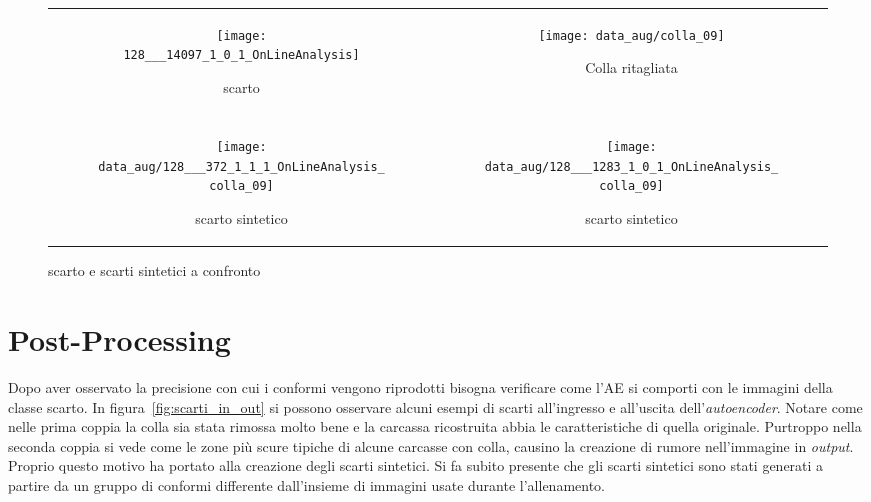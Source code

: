 \begin{figure}[ht] %
  \begin{center}
    \begin{tabular}{cc}
      \begin{subfigure}{.4\linewidth}
        \centering\texttt{[image: 128\_\_\_14097\_1\_0\_1\_OnLineAnalysis]}
        \caption{scarto}
      \end{subfigure} &

      \begin{subfigure}{.4\linewidth}
        \centering\texttt{[image: data\_aug/colla\_09]}
        \caption{Colla ritagliata}
        \label{fig:ritaglio_colla}
      \end{subfigure} \\ \\

      \begin{subfigure}{.4\linewidth}
        \centering\texttt{[image: data\_aug/128\_\_\_372\_1\_1\_1\_OnLineAnalysis\_colla\_09]}
        \caption{scarto sintetico}
        \label{fig:scarto_sintetico_c}
      \end{subfigure} &

      \begin{subfigure}{.4\linewidth}
        \centering\texttt{[image: data\_aug/128\_\_\_1283\_1\_0\_1\_OnLineAnalysis\_colla\_09]}
        \caption{scarto sintetico}
        \label{fig:scarto_sintetico_d}
      \end{subfigure}
    \end{tabular}
    \caption{scarto e scarti sintetici a confronto}
    \label{fig:esempi_scarti_sintetici}
  \end{center}
\end{figure}

\section{Post-Processing}
Dopo aver osservato la precisione con cui i conformi vengono riprodotti bisogna verificare come l'AE si comporti con le immagini della classe scarto.
In figura~\ref{fig:scarti_in_out} si possono osservare alcuni esempi di scarti all'ingresso e all'uscita dell'\textit{autoencoder}.
Notare come nelle prima coppia la colla sia stata rimossa molto bene e la carcassa ricostruita abbia le caratteristiche di quella originale.
Purtroppo nella seconda coppia si vede come le zone più scure tipiche di alcune carcasse con colla, causino la creazione di rumore nell'immagine in \textit{output}.
Proprio questo motivo ha portato alla creazione degli scarti sintetici.
Si fa subito presente che gli scarti sintetici sono stati generati a partire da un gruppo di conformi differente dall'insieme di immagini usate durante l'allenamento.


